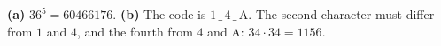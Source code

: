 \textbf{(a)} $36^5=\boxed{60466176}$. \textbf{(b)} The code is $1\,\_\,4\,\_\,$A. The second character must differ from $1$ and $4$, and the fourth from $4$ and A: $34\cdot34=\boxed{1156}$.
